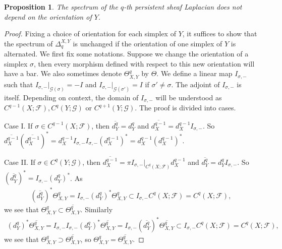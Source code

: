 \documentclass[11pt]{article}
\newtheorem{proposition}{Proposition}[section]
\theoremstyle{definition}
\theoremstyle{definition}
\begin{document}
\begin{proposition}
    The spectrum of the $q$-th persistent sheaf Laplacian does not depend on the orientation of $Y$.
\end{proposition}

\begin{proof}
    Fixing a choice of orientation for each simplex of $Y$,
    it suffices to show that the spectrum of $\Delta_q^{X,Y}$ is unchanged if the orientation of one simplex of $Y$ is alternated.
    We first fix some notations. Suppose we change the orientation of a simplex $\sigma$, then every morphism
    defined with respect to this new orientation will have a bar. We also sometimes denote $\Theta^q_{X,Y}$ by $\Theta$.
    We define a linear map $I_{\sigma, -}$ such that $I_{\sigma, -}\vert_{\mathscr{G}(\sigma)} = -I$ and 
    $I_{\sigma, -}\vert_{\mathscr{G}(\sigma')} = I$ if $\sigma' \neq \sigma$.
    The adjoint of $I_{\sigma, -}$ is itself.
    Depending on context, the domain of $I_{\sigma, -}$ will be understood as 
    $C^{q-1}(X; \mathscr{F}), C^q(Y; \mathscr{G})$ or $C^{q+1}(Y; \mathscr{G})$.
    The proof is divided into cases.
    
    Case I. If $\sigma \in C^{q-1}(X; \mathscr{F})$,
    then $\overline{d^q_{Y}} = d^q_{Y}$ and 
    $\overline{d^{q-1}_X} = d^{q-1}_X I_{\sigma, -}$.
    So $\overline{d^{q-1}_X}(\overline{d^{q-1}_{X}})^{\ast}=
    d^{q-1}_X I_{\sigma, -} I_{\sigma, -}(d^{q-1}_X)^{\ast} = d^{q-1}_X(d^{q-1}_X)^{\ast}$.
    
    Case II. If $\sigma \in C^{q}(Y; \mathscr{G})$,
    then $\overline{d^{q-1}_X} = \pi I_{\sigma, -}\vert_{C^q(X; \mathscr{F})} d^{q-1}_X$
    and $\overline{d^q_{Y}} = d^q_{Y} I_{\sigma, -}$.
    So $(\overline{d^q_{Y}})^{\ast} = I_{\sigma, -} (d^q_{Y})^{\ast}$. As 
    \begin{align*}
        (\overline{d^q_{Y}})^{\ast}\Theta^{q}_{X,Y} = I_{\sigma, -} (d^q_{Y})^{\ast}\Theta^{q}_{X,Y} \subset I_{\sigma, -}C^q(X; \mathscr{F}) = C^q(X; \mathscr{F}),
    \end{align*}we see that $\Theta^{q}_{X,Y} \subset \overline{\Theta^q_{X,Y}}$. 
    Similarly  
    \begin{align*}
        (d^q_{Y})^{\ast} \overline{\Theta^q_{X,Y}} = I_{\sigma, -}I_{\sigma, -}(d^q_{Y})^{\ast} \overline{\Theta^q_{X,Y}} 
        = I_{\sigma, -} (\overline{d^q_{Y}})^{\ast}\overline{\Theta^q_{X,Y}} \subset I_{\sigma, -}C^q(X;\mathscr{F})=C^q(X; \mathscr{F}),
    \end{align*}
    we see that $\Theta^{q}_{X,Y} \supset \overline{\Theta^{q}_{X,Y}}$, so $\Theta^{q}_{X,Y} = \overline{\Theta^{q}_{X,Y}}$.


\end{proof}
\end{document}

